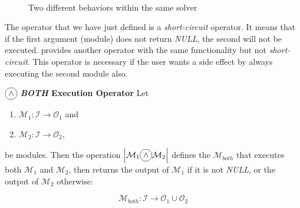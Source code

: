 \begin{figure}[h]
\centering
{}\\
\caption[]{Two different behaviors within the same solver}
\label{fig:2difBeh}
\end{figure}

\separation

The operator that we have just defined is a {\it short-circuit} operator. It means that if the first argument (module) does not return {\it NULL}, the second will not be executed. \posl{} provides another operator with the same functionality but not {\it short-circuit}. This operator is necessary if the user wants a side effect by always executing the second module also.


\begin{definition}\label{op:and}
$\circled{$\wedge$}$ {\bf {\it BOTH} Execution Operator} Let 
\begin{enumerate}%
	\item $\mathcal{M}_1 : \mathcal{I} \rightarrow \mathcal{O}_1$ and  
	\item $\mathcal{M}_2 : \mathcal{I} \rightarrow \mathcal{O}_2$,
\end{enumerate}%
be modules. %
Then the operation $\left|\mathcal{M}_1\circled{$\wedge$}\mathcal{M}_2\right|$ defines the \cm{} $\mathcal{M}_{both}$ that executes both $\mathcal{M}_1$ and $\mathcal{M}_2$, then returns the output of $\mathcal{M}_1$ if it is not {\it NULL}, or the output of $\mathcal{M}_2$ otherwise:

\[
\mathcal{M}_{both}:\mathcal{I} \rightarrow \mathcal{O}_1 \cup \mathcal{O}_2 
\]
\end{definition}

\separation

